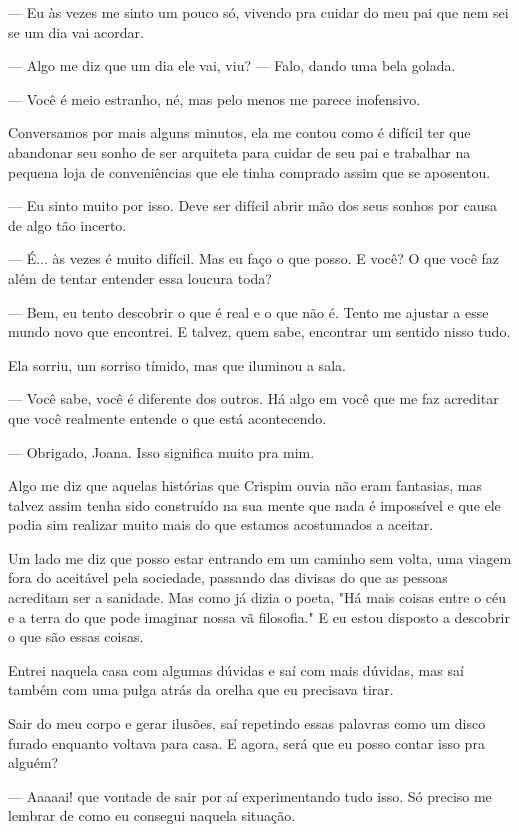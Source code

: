 — Eu às vezes me sinto um pouco só, vivendo pra cuidar do meu pai que nem sei se um dia vai acordar.

— Algo me diz que um dia ele vai, viu? — Falo, dando uma bela golada.

— Você é meio estranho, né, mas pelo menos me parece inofensivo.

Conversamos por mais alguns minutos, ela me contou como é difícil ter que abandonar seu sonho de ser arquiteta para cuidar de seu pai e trabalhar na pequena loja de conveniências que ele tinha comprado assim que se aposentou.

— Eu sinto muito por isso. Deve ser difícil abrir mão dos seus sonhos por causa de algo tão incerto.

— É... às vezes é muito difícil. Mas eu faço o que posso. E você? O que você faz além de tentar entender essa loucura toda?

— Bem, eu tento descobrir o que é real e o que não é. Tento me ajustar a esse mundo novo que encontrei. E talvez, quem sabe, encontrar um sentido nisso tudo.

Ela sorriu, um sorriso tímido, mas que iluminou a sala.

— Você sabe, você é diferente dos outros. Há algo em você que me faz acreditar que você realmente entende o que está acontecendo. 

— Obrigado, Joana. Isso significa muito pra mim. 

Algo me diz que aquelas histórias que Crispim ouvia não eram fantasias, mas talvez assim tenha sido construído na sua mente que nada é impossível e que ele podia sim realizar muito mais do que estamos acostumados a aceitar.

Um lado me diz que posso estar entrando em um caminho sem volta, uma viagem fora do aceitável pela sociedade, passando das divisas do que as pessoas acreditam ser a sanidade. Mas como já dizia o poeta, "Há mais coisas entre o céu e a terra do que pode imaginar nossa vã filosofia." E eu estou disposto a descobrir o que são essas coisas.

Entrei naquela casa com algumas dúvidas e saí com mais dúvidas, mas saí também com uma pulga atrás da orelha que eu precisava tirar.

Sair do meu corpo e gerar ilusões, saí repetindo essas palavras como um disco furado enquanto voltava para casa. E agora, será que eu posso contar isso pra alguém?

— Aaaaai! que vontade de sair por aí experimentando tudo isso. Só preciso me lembrar de como eu consegui naquela situação.